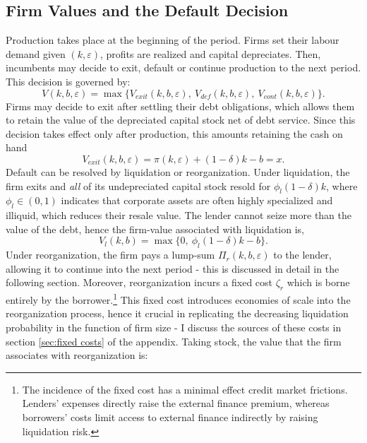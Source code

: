 \documentclass[12pt]{article}
\begin{document}
\subsection{Firm Values and the Default Decision } \label{sec:defaults}
Production takes place at the beginning of the period. Firms set their labour demand given $(k,\varepsilon)$, profits are realized and capital depreciates. Then, incumbents may decide to exit, default or continue production to the next period. This decision is governed by: 
\begin{equation} \label{eq:default decision}
    V(k,b,\varepsilon) = \max \{ V_{exit}(k,b,\varepsilon), \ V_{def}(k,b,\varepsilon), \ V_{cont}(k,b,\varepsilon) \}.
\end{equation}
Firms may decide to exit after settling their debt obligations, which allows them to retain the value of the depreciated capital stock net of debt service. Since this decision takes effect only after production, this amounts retaining the cash on hand
\begin{equation}
    V_{exit}(k, b, \varepsilon) = \pi(k,\varepsilon) + (1-\delta)k - b  = x.
\end{equation}
Default can be resolved by liquidation or reorganization. Under liquidation, the firm exits and \textit{all} of its undepreciated capital stock resold for $\phi_l(1-\delta)k$, where $\phi_l \in (0,1)$ indicates that corporate assets are often highly specialized and illiquid, which reduces their resale value. The lender cannot seize more than the value of the debt, hence the firm-value associated with liquidation is,
\begin{equation}
    V_{l}(k, b) = \max \{ 0, \ \phi_l(1-\delta)k - b  \}.
\end{equation}
Under reorganization, the firm pays a lump-sum $\Pi_{r}(k, b, \varepsilon)$ to the lender, allowing it to continue into the next period - this is discussed in detail in the following section. Moreover, reorganization incurs a fixed cost $\zeta_r$ which is borne entirely by the borrower.\footnote{The incidence of the fixed cost has a minimal effect credit market frictions. Lenders' expenses directly raise the external finance premium, whereas borrowers' costs limit access to external finance indirectly by raising liquidation risk.} This fixed cost introduces economies of scale into the reorganization process, hence it crucial in replicating the decreasing liquidation probability in the function of firm size - I discuss the sources of these costs in section \ref{sec:fixed costs} of the appendix. Taking stock, the value that the firm associates with reorganization is: 
\end{document}
